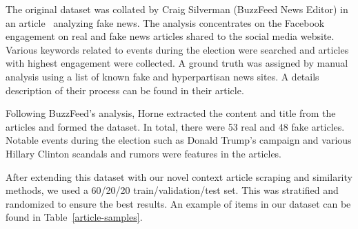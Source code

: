 \documentclass{article}
\begin{document}
The original dataset was collated by Craig Silverman (BuzzFeed News Editor) in an article~\cite{dataset-buzzfeed} analyzing fake news. The analysis concentrates on the Facebook engagement on real and fake news articles shared to the social media website. Various keywords related to events during the election were searched and articles with highest engagement were collected. A ground truth was assigned by manual analysis using a list of known fake and hyperpartisan news sites. A details description of their process can be found in their article.

Following BuzzFeed's analysis, Horne extracted the content and title from the articles and formed the dataset. In total, there were 53 real and 48 fake articles. Notable events during the election such as Donald Trump's campaign and various Hillary Clinton scandals and rumors were features in the articles.

After extending this dataset with our novel context article scraping and similarity methods, we used a 60/20/20 train/validation/test set. This was stratified and randomized to ensure the best results. An example of items in our dataset can be found in Table~\ref{article-samples}.

\begin{table}
  \begin{center}
  \end{center}
  \caption{A sample of one fake and real article in our dataset. The article ID, title and content are shown in the rows. Both articles are regarding a scandal with Hillary Clinton using a private server to store emails. The fake article reports on an event that never happens whereas the real article reports the true event -- that Clinton was exonerated from criminality.}
  \label{article-samples}
\end{table}
\end{document}

